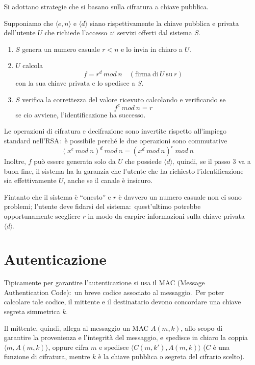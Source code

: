 \begin{flushleft}
    Si adottano strategie che si basano sulla cifratura a chiave pubblica.\
\end{flushleft}

\noindent Supponiamo che $\langle e, n \rangle$ e $\langle d \rangle$ siano rispettivamente la chiave pubblica e privata dell'utente $U$ che richiede l'accesso ai servizi offerti dal sistema $S$.\

\begin{enumerate}
    \item $S$ genera un numero casuale $r < n$ e lo invia in chiaro a $U$.
    \item $U$ calcola
          \[f = r^d\ \mathit{mod}\ n\quad (\mathrm{firma\ di}\ U\ \mathrm{su}\ r)\]
          con la sua chiave privata e lo spedisce a $S$.\
    \item $S$ verifica la correttezza del valore ricevuto calcolando e verificando se
          \[f^e\ \mathit{mod}\ n = r \]
          se cio avviene, l'identificazione ha successo.
\end{enumerate}

\noindent Le operazioni di cifratura e decifrazione sono invertite rispetto all'impiego standard nell'RSA:\ è possibile perché le due operazioni sono commutative
\[(x^e\ \mathit{mod}\ n)^d\ \mathit{mod}\ n = (x^d\ \mathit{mod}\ n)^e\ \mathit{mod}\ n\]
Inoltre, $f$ può essere generata solo da $U$ che possiede $\langle d \rangle$, quindi, se il passo 3 va a buon fine, il sistema ha la garanzia che l'utente che ha richiesto l'identificazione sia effettivamente $U$, anche se il canale è insicuro.\

Fintanto che il sistema è ``onesto'' e $r$ è davvero un numero casuale non ci sono problemi; l'utente deve fidarsi del sistema:\ quest'ultimo potrebbe opportunamente scegliere $r$ in modo da carpire informazioni sulla chiave privata $\langle d \rangle$.\

\section{Autenticazione}

Tipicamente per garantire l'autenticazione si usa il MAC (Message Authentication Code):\ un breve codice associato al messaggio.\
Per poter calcolare tale codice, il mittente e il destinatario devono concordare una chiave segreta simmetrica $k$.\

Il mittente, quindi, allega al messaggio un MAC $A(m, k)$, allo scopo di garantire la provenienza e l'integrità del messaggio, e spedisce in chiaro la coppia $\langle m, A (m, k)\rangle$, oppure cifra $m$ e spedisce $\langle C(m, k'), A (m, k)\rangle$ ($C$ è una funzione di cifratura, mentre $k$ è la chiave pubblica o segreta del cifrario scelto).\

